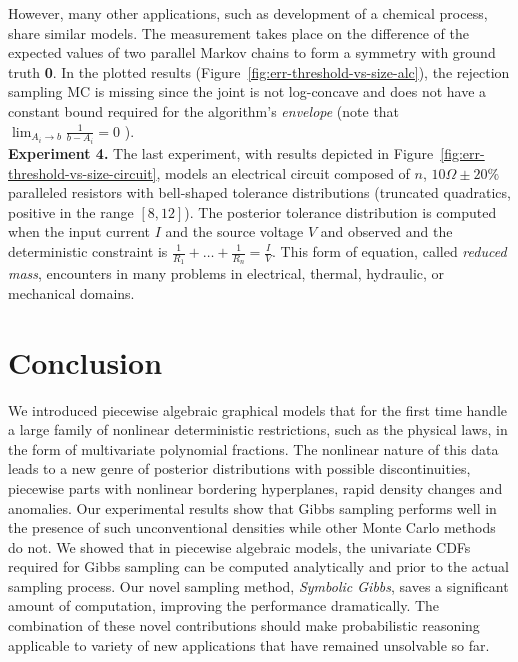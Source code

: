 \documentclass[letterpaper]{article}
\begin{document}
However, many other applications, such as development of a chemical process, share similar models.  
The measurement takes place on the difference of the expected values of two parallel Markov chains to form a symmetry with ground truth \textbf{0}.
In the plotted results (Figure~\ref{fig:err-threshold-vs-size-alc}), 
the rejection sampling MC is missing since the joint is not log-concave and does not have a constant bound required for the algorithm's \emph{envelope} 
(note that $\lim_{A_{i} \rightarrow b} \frac{1}{b - A_{i}} = 0$ ).
\\
\textbf{Experiment 4.} The last experiment, with results depicted in 
Figure~\ref{fig:err-threshold-vs-size-circuit}, models an electrical circuit composed of $n$, $10\Omega\pm20\%$ paralleled resistors with bell-shaped tolerance distributions (truncated quadratics, positive in the range $[8, 12]$). The posterior tolerance distribution is computed when 
the input current $I$ and the source voltage $V$ and observed and the deterministic constraint is $\frac{1}{R_1} + \ldots + \frac{1}{R_n} = \frac{I}{V}$.
This form of equation, called \emph{reduced mass}, encounters in many problems in electrical, thermal, hydraulic, or mechanical domains. 

\section{Conclusion}

We introduced piecewise algebraic graphical models that for the first time handle a large family of nonlinear deterministic restrictions, such as the physical laws, in the form of multivariate polynomial fractions. The nonlinear nature of this data leads to a new genre of posterior distributions with possible discontinuities, 
piecewise parts with nonlinear bordering hyperplanes, rapid density changes and anomalies. Our experimental results show that Gibbs sampling performs well in the presence of such unconventional densities while other Monte Carlo methods do not. We showed that in piecewise algebraic models, the univariate CDFs required for Gibbs sampling can be computed analytically and prior to the actual sampling process. Our novel sampling method, \emph{Symbolic Gibbs}, saves a significant amount of computation, improving the performance dramatically. The combination of these novel contributions should make probabilistic reasoning applicable to variety of new applications that have remained unsolvable so far.      






\end{document}
